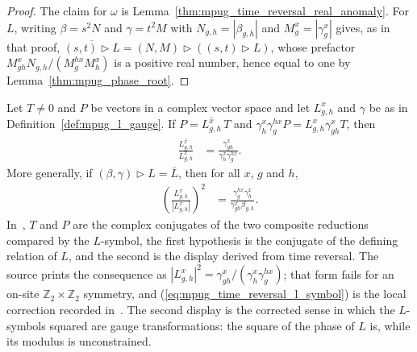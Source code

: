 \begin{proof}\leanok
    The claim for $\omega$ is Lemma~\ref{thm:mpug_time_reversal_real_anomaly}.
    For $L$, writing $\beta=s^2N$ and $\gamma=t^2M$ with
    $N_{g,h}=|\beta_{g,h}|$ and $M^x_g=|\gamma^x_g|$ gives, as in that proof,
    $\overline{(s,t)\mathbin{\triangleright}L}
        =(N,M)\mathbin{\triangleright}((s,t)\mathbin{\triangleright}L)$, whose
    prefactor
    $M^x_{gh}N_{g,h}/(M^{h x}_gM^x_h)$ is a positive real number, hence
    equal to one by Lemma~\ref{thm:mpug_phase_root}.
\end{proof}

\begin{lemma}
    \label{thm:mpug_time_reversal_l_symbol_relation}
    \leanok
    Let $T\neq0$ and $P$ be vectors in a complex vector space and let
    $L^x_{g,h}$ and $\gamma$ be as in Definition~\ref{def:mpug_l_gauge}.
    If $P=\overline{L^x_{g,h}}\,T$ and
    $\gamma^x_h\gamma^{h x}_gP=L^x_{g,h}\gamma^x_{gh}T$, then
    \begin{align}
        \frac{\overline{L^x_{g,h}}}{L^x_{g,h}}
         & =\frac{\gamma^x_{gh}}{\gamma^x_h\gamma^{h x}_g}.
        \label{eq:mpug_time_reversal_l_symbol}
    \end{align}
    More generally, if $(\beta,\gamma)\mathbin{\triangleright}L=\overline L$,
    then for all $x$, $g$ and $h$,
    \begin{align}
        \left(\frac{L^x_{g,h}}{|L^x_{g,h}|}\right)^2
         & =\frac{\gamma^{h x}_g\gamma^x_h}{\gamma^x_{gh}\beta_{g,h}}.
    \end{align}
    In~\cite[Section~4.3]{GarreRubio2023MPOSym}, $T$ and $P$ are the
    complex conjugates of the two composite reductions compared by the
    $L$-symbol, the first hypothesis is the conjugate of the defining
    relation of $L$, and the second is the display derived from time
    reversal. The source prints the consequence as
    $|L^x_{g,h}|^2=\gamma^x_{gh}/(\gamma^x_h\gamma^{h x}_g)$; that form fails
    for an on-site $\mathbb Z_2\times\mathbb Z_2$ symmetry, and
    (\ref{eq:mpug_time_reversal_l_symbol}) is the local correction recorded
    in~\cite{gap:glm23_time_reversal_l_symbol}. The second display is the
    corrected sense in which the $L$-symbols squared are gauge
    transformations: the square of the phase of $L$ is, while its modulus is
    unconstrained.
\end{lemma}


